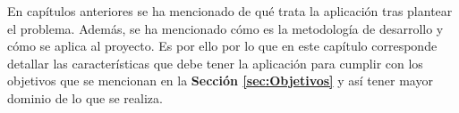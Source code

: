 En capítulos anteriores se ha mencionado de qué trata la aplicación tras plantear el problema. Además, se ha mencionado cómo es la metodología de desarrollo y cómo se aplica al proyecto. Es por ello por lo que en este capítulo corresponde detallar las características que debe tener la aplicación para cumplir con los objetivos que se mencionan en la \textbf{Sección \ref{sec:Objetivos}} y así tener mayor dominio de lo que se realiza.